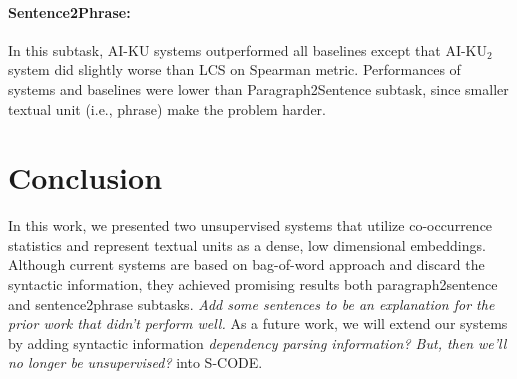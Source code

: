 \documentclass[11pt]{article}
\begin{document}
\paragraph{Sentence2Phrase:} In this subtask, AI-KU systems outperformed all baselines except that AI-KU$_2$ system did slightly worse than LCS on Spearman metric. Performances of systems and baselines were lower than Paragraph2Sentence subtask, since smaller textual unit (i.e., phrase) make the problem harder.




\section{Conclusion}
\label{conclusion}

In this work, we presented two unsupervised systems that utilize co-occurrence statistics and represent textual units as a dense, low dimensional embeddings. 
Although current systems are based on bag-of-word approach and discard the syntactic information, they achieved promising results both paragraph2sentence and sentence2phrase subtasks. \emph{Add some sentences to be an explanation for the prior work that didn't perform well.} As a future work, we will extend our systems by adding syntactic information \emph{dependency parsing information? But, then we'll no longer be unsupervised?} into S-CODE.  



% 




\end{document}
